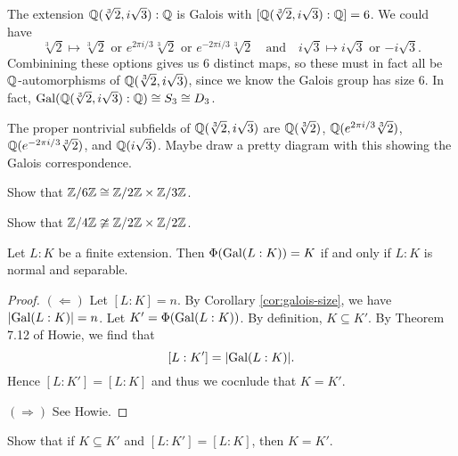 \begin{example}
  The extension $\mathbb{Q}(\sqrt[3]{2}, i\sqrt{3}) : \mathbb{Q}$ is
  Galois with $[\mathbb{Q}(\sqrt[3]{2}, i\sqrt{3}) : \mathbb{Q}] = 6$.
  We could have
  \[
    \sqrt[3]{2} \mapsto \sqrt[3]{2} \text{ or } e^{2\pi i / 3} \sqrt[3]{2} \text{ or } e^{-2\pi i / 3} \sqrt[3]{2}
    \quad \text{and} \quad
    i\sqrt{3} \mapsto i\sqrt{3} \text{ or } {-i\sqrt{3}}.
  \]
  Combinining these options gives us $6$ distinct
  maps, so these must in fact all be
  $\mathbb{Q}$-automorphisms of $\mathbb{Q}(\sqrt[3]{2}, i\sqrt{3})$,
  since we know the Galois group has size $6$.
  In fact, $\operatorname{Gal}(\mathbb{Q}(\sqrt[3]{2}, i\sqrt{3}) : \mathbb{Q}) \cong S_3 \cong D_3$.
\end{example}

\begin{remark}
  The proper nontrivial subfields of
  $\mathbb{Q}(\sqrt[3]{2}, i\sqrt{3})$ are
  $\mathbb{Q}(\sqrt[3]{2})$, $\mathbb{Q}(e^{2\pi i / 3}\sqrt[3]{2})$,
  $\mathbb{Q}(e^{-2\pi i / 3}\sqrt[3]{2})$, and
  $\mathbb{Q}(i\sqrt{3})$. Maybe draw a pretty diagram with this
  showing the Galois correspondence.
\end{remark}

\begin{exercise}
  Show that $\mathbb{Z} / 6\mathbb{Z} \cong \mathbb{Z} / 2\mathbb{Z} \times \mathbb{Z} / 3\mathbb{Z}$.
\end{exercise}

\begin{exercise}
  Show that $\mathbb{Z} / 4\mathbb{Z} \ncong \mathbb{Z} / 2\mathbb{Z} \times \mathbb{Z} / 2\mathbb{Z}$.
\end{exercise}

\begin{theorem}
  Let $L : K$ be a finite extension.
  Then $\Phi(\operatorname{Gal}(L : K)) = K$ if and only if
  $L : K$ is normal and separable.
\end{theorem}

\begin{proof}
  $(\Leftarrow)$ Let $[L : K] = n$. By Corollary
  \ref{cor:galois-size}, we have $|{\operatorname{Gal}(L : K)}| = n$.
  Let $K' = \Phi(\operatorname{Gal}(L : K))$. By definition,
  $K \subseteq K'$. By Theorem 7.12 of Howie, we find that
  \[
    [L : K'] = |{\operatorname{Gal}(L : K)}|.
  \]
  Hence $[L : K'] = [L : K]$ and thus we cocnlude
  that $K = K'$.

  $(\Rightarrow)$ See Howie.
\end{proof}

\begin{exercise}
  Show that if $K \subseteq K'$ and
  $[L : K'] = [L : K]$, then $K = K'$.
\end{exercise}

